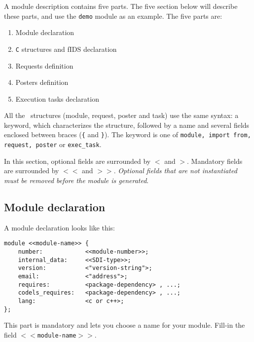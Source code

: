 A  module description contains five   parts. The five section below  will
describe these parts, and use the \texttt{demo} module as an example.
The five parts are:

\begin{enumerate}
\item Module declaration
\item \texttt{C} structures and fIDS declaration
\item Requests definition
\item Posters definition
\item Execution tasks declaration
\end{enumerate}

All the  \GenoM\ structures (module,  request, poster  and task) use  the
same syntax: a keyword, which characterizes the  structure, followed by a
name and several fields enclosed between  braces (\texttt{\{} and \texttt{\}}).
The keyword is one of \texttt{module, import  from, request, poster} or 
\texttt{exec\_task}.

In this section, optional  fields are  surrounded  by \texttt{$<$} and  
\texttt{$>$}. Mandatory fields are surrounded by  \texttt{$<<$} and \texttt{$>>$}. {\em
Optional   fields that are not  instantiated  must  be removed before the
module is generated}.

\subsection{Module declaration}

A module declaration looks like this:

\begin{center}\begin{cartouche}\small\begin{verbatim}
module <<module-name>> {
    number:            <<module-number>>;
    internal_data:     <<SDI-type>>;
    version:           <"version-string">;
    email:             <"address">;
    requires:          <package-dependency> , ...;
    codels_requires:   <package-dependency> , ...;
    lang:              <c or c++>;
};
\end{verbatim}\end{cartouche}\end{center}


This part   is  mandatory  and    lets   you  choose a  name   for   your
module.  Fill-in the field  \texttt{$<<$module-name$>>$}.

